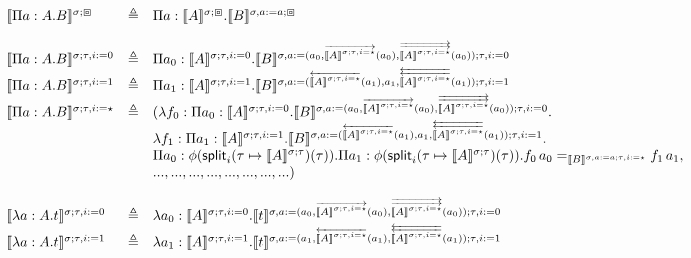 \documentclass{article}
\newcommand{\emptyctx}{\boxbox}
\newcommand{\defeq}{\triangleq}
\begin{document}
$$\begin{array}{lcl}
\\
\semtype{\sigma}{\emptyctx}{\Pi a:A.B} & \defeq &
  \Pi a:\semtype{\sigma}{\emptyctx}{A}.\semtype{\sigma,a:=a}{\emptyctx}{B}\\
\\
\semtype{\sigma}{\tau,i:=0}{\Pi a:A.B} & \defeq &
  \Pi a_0:\semtype{\sigma}{\tau,i:=0}{A}.
  \semtype{\sigma,a:=
     (a_0,
      \overrightarrow{\semtype{\sigma}{\tau,i=\star}{A}}(a_0),
      \overrightarrow{\overrightarrow{\semtype{\sigma}{\tau,i=\star}{A}}}(a_0))}
     {\tau,i:=0}{B}\\
\semtype{\sigma}{\tau,i:=1}{\Pi a:A.B} & \defeq &
  \Pi a_1:\semtype{\sigma}{\tau,i:=1}{A}.
  \semtype{\sigma,a:=
     (\overleftarrow{\semtype{\sigma}{\tau,i=\star}{A}}(a_1),
      a_1,
      \overleftarrow{\overleftarrow{\semtype{\sigma}{\tau,i=\star}{A}}}(a_1))}
     {\tau,i:=1}{B}\\
\semtype{\sigma}{\tau,i:=\star}{\Pi a:A.B} & \defeq &
  (\lambda f_0:\Pi a_0:\semtype{\sigma}{\tau,i:=0}{A}.
  \semtype{\sigma,a:=
     (a_0,
      \overrightarrow{\semtype{\sigma}{\tau,i=\star}{A}}(a_0),
      \overrightarrow{\overrightarrow{\semtype{\sigma}{\tau,i=\star}{A}}}(a_0))}
     {\tau,i:=0}{B}.\\
& &  \lambda f_1:\Pi a_1:\semtype{\sigma}{\tau,i:=1}{A}.\semtype{\sigma,a:=
     (\overleftarrow{\semtype{\sigma}{\tau,i=\star}{A}}(a_1),
      a_1,
      \overleftarrow{\overleftarrow{\semtype{\sigma}{\tau,i=\star}{A}}}(a_1))}
     {\tau,i:=1}{B}.\\
& &  \Pi a_0:\phi(\incrstep{i}{\tau}{(\tau \mapsto \semtype{\sigma}{\tau}{A})}).
  \Pi a_1:\phi(\incrstep{i}{\tau}{(\tau \mapsto \semtype{\sigma}{\tau}{A})}).
  f_0\, a_0 =_{\semtype{\sigma,a:=a}{\tau,i:=\star}{B}} f_1\, a_1,\\
& &
  ..., ...,   ..., ...,   ..., ...,   ..., ...)\\
\\
\semterm{\sigma}{\tau,i:=0}{\lambda a:A.t} & \defeq &
  \lambda a_0:\semtype{\sigma}{\tau,i:=0}{A}.
  \semterm{\sigma,a:=
     (a_0,
      \overrightarrow{\semtype{\sigma}{\tau,i=\star}{A}}(a_0),
      \overrightarrow{\overrightarrow{\semtype{\sigma}{\tau,i=\star}{A}}}(a_0))}
     {\tau,i:=0}{t}\\
\semterm{\sigma}{\tau,i:=1}{\lambda a:A.t} & \defeq &
  \lambda a_1:\semtype{\sigma}{\tau,i:=1}{A}.
  \semterm{\sigma,a:=
     (a_1,
      \overleftarrow{\semtype{\sigma}{\tau,i=\star}{A}}(a_1),
      \overleftarrow{\overleftarrow{\semtype{\sigma}{\tau,i=\star}{A}}}(a_1))}
     {\tau,i:=1}{t}\\

\end{array}$$
\end{document}
